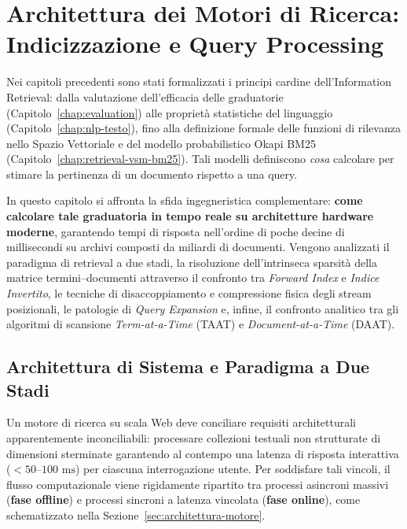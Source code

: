 \chapter{Architettura dei Motori di Ricerca: Indicizzazione e Query Processing}
\label{chap:indicizzazione-query-processing}

Nei capitoli precedenti sono stati formalizzati i principi cardine dell'Information Retrieval: dalla valutazione dell'efficacia delle graduatorie (Capitolo~\ref{chap:evaluation}) alle propriet\`a statistiche del linguaggio (Capitolo~\ref{chap:nlp-testo}), fino alla definizione formale delle funzioni di rilevanza nello Spazio Vettoriale e del modello probabilistico Okapi BM25 (Capitolo~\ref{chap:retrieval-vsm-bm25}). Tali modelli definiscono \textit{cosa} calcolare per stimare la pertinenza di un documento rispetto a una query.

In questo capitolo si affronta la sfida ingegneristica complementare: \textbf{come calcolare tale graduatoria in tempo reale su architetture hardware moderne}, garantendo tempi di risposta nell'ordine di poche decine di millisecondi su archivi composti da miliardi di documenti. Vengono analizzati il paradigma di retrieval a due stadi, la risoluzione dell'intrinseca sparsit\`a della matrice termini--documenti attraverso il confronto tra \textit{Forward Index} e \textit{Indice Invertito}, le tecniche di disaccoppiamento e compressione fisica degli stream posizionali, le patologie di \textit{Query Expansion} e, infine, il confronto analitico tra gli algoritmi di scansione \textit{Term-at-a-Time} (TAAT) e \textit{Document-at-a-Time} (DAAT).

\FloatBarrier
\section{Architettura di Sistema e Paradigma a Due Stadi}
\label{sec:architettura-due-stadi}

Un motore di ricerca su scala Web deve conciliare requisiti architetturali apparentemente inconciliabili: processare collezioni testuali non strutturate di dimensioni sterminate garantendo al contempo una latenza di risposta interattiva ($< 50\text{--}100\text{ ms}$) per ciascuna interrogazione utente. Per soddisfare tali vincoli, il flusso computazionale viene rigidamente ripartito tra processi asincroni massivi (\textbf{fase offline}) e processi sincroni a latenza vincolata (\textbf{fase online}), come schematizzato nella Sezione~\ref{sec:architettura-motore}.

